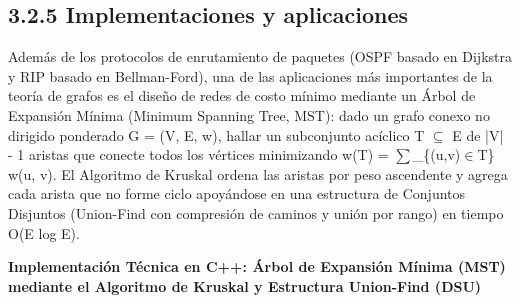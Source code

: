 \documentclass[11pt,letterpaper]{article}
\begin{document}
\subsection*{3.2.5 Implementaciones y aplicaciones}
Además de los protocolos de enrutamiento de paquetes (OSPF basado en Dijkstra y RIP basado en Bellman-Ford), una de las aplicaciones más importantes de la teoría de grafos es el diseño de redes de costo mínimo mediante un Árbol de Expansión Mínima (Minimum Spanning Tree, MST): dado un grafo conexo no dirigido ponderado G = (V, E, w), hallar un subconjunto acíclico T $\subseteq$ E de |V| - 1 aristas que conecte todos los vértices minimizando w(T) = $\sum$\_\{(u,v)$\in$T\} w(u, v). El Algoritmo de Kruskal ordena las aristas por peso ascendente y agrega cada arista que no forme ciclo apoyándose en una estructura de Conjuntos Disjuntos (Union-Find con compresión de caminos y unión por rango) en tiempo O(E log E).\par
\vspace{4pt}\noindent\textbf{\color{ipnblue}Implementación Técnica en C++: Árbol de Expansión Mínima (MST) mediante el Algoritmo de Kruskal y Estructura Union-Find (DSU)}\par\vspace{-2pt}
\end{document}
